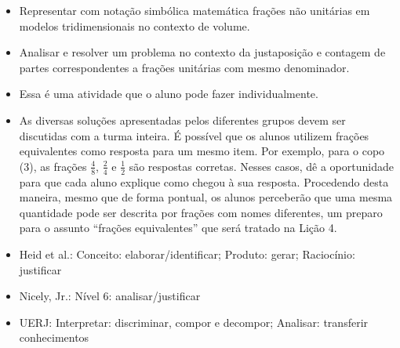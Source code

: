 \begin{multicols}{2}
   \vspace{.1cm}

  \begin{itemize} %
    \item       Representar com notação simbólica matemática frações não unitárias em modelos tridimensionais no contexto de volume.
    \item       Analisar e resolver um problema no contexto da justaposição e contagem de partes correspondentes a frações unitárias com mesmo denominador.
\end{itemize} %


  \vspace{.1cm}

    \vspace{.1cm}

    \begin{itemize} %
    \item       Essa é uma atividade que o aluno pode fazer individualmente.
    \item       As diversas soluções apresentadas pelos diferentes grupos devem ser discutidas com a turma inteira. É possível que os alunos utilizem frações equivalentes como resposta para um mesmo item. Por exemplo, para o copo (3), as frações       $\frac{4}{8}$,       $\frac{2}{4}$ e       $\frac{1}{2}$ são respostas corretas. Nesses casos, dê a oportunidade para que cada aluno explique como chegou à sua resposta. Procedendo desta maneira, mesmo que de forma pontual, os alunos perceberão que uma mesma quantidade pode ser descrita por frações com nomes diferentes, um preparo para o assunto       ``frações equivalentes''     que será tratado na Lição 4.
\end{itemize} %


  \vspace{.1cm}

 \vspace{.1cm}
\begin{itemize} %
    \item       Heid et al.: Conceito: elaborar/identificar; Produto: gerar; Raciocínio: justificar
    \item       Nicely, Jr.: Nível 6: analisar/justificar
    \item       UERJ: Interpretar: discriminar, compor e decompor; Analisar: transferir conhecimentos
\end{itemize} %



\end{multicols}
